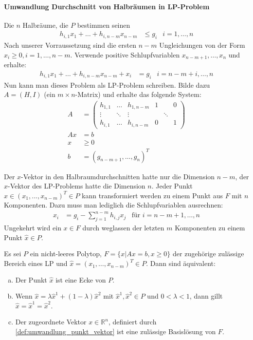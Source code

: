 \paragraph*{Umwandlung  Durchschnitt von Halbräumen in LP-Problem}
Die $n$ Halbräume, die $P$ bestimmen seinen
\begin{align*}
h_{i,1} x_1 + \dotsc + h_{i,n-m} x_{n-m} &\leq g_i & i = 1,\dotsc,n
\end{align*}
Nach unserer Vorraussetzung sind die ersten $n-m$ Ungleichungen von der Form $x_i \geq 0, i = 1,\dotsc,n-m$.
Verwende positive Schlupfvariablen $x_{n-m+1}, \dotsc , x_n$ und erhalte:
\begin{align*}
h_{i,1} x_1 + \dotsc + h_{i,n-m} x_{n-m} + x_i &= g_i & i = n-m+i,\dotsc,n
\end{align*} 
Nun kann man dieses Problem als LP-Problem schreiben. Bilde dazu $A = ( H, I )$ (ein $m\times n$-Matrix) und erhalte das folgende System:
\begin{align*}
A &= \begin{pmatrix}
h_{1,1} & \hdots & h_{1,n-m} & 1 && 0\\
\vdots & \ddots & \vdots && \ddots & \\
h_{i,1} & \hdots & h_{i,n-m} & 0 && 1
\end{pmatrix}\\
Ax &= b\\
x &\geq 0\\
b &= (g_{n-m+1},\dotsc,g_n)^T
\end{align*}
\begin{definition}\label{def:umwandlung_punkt_vektor}
Der $x$-Vektor in den Halbraumdurchschnitten hatte nur die Dimension $n-m$, der $x$-Vektor des LP-Problems hatte die Dimension $n$. 
Jeder Punkt $\hat{x} \in (x_1,...,x_{n-m})^T \in P$ kann transformiert werden zu einem Punkt aus $F$ mit $n$ Komponenten. Dazu muss man lediglich die Schlupfvariablen ausrechnen:
\begin{align*}
x_i &= g_i - \sum_{j=1}^{n-m} h_{i,j}x_j & \text{für $i=n-m+1,\dotsc,n$}
\end{align*}
Ungekehrt wird ein $x\in F$ durch weglassen der letzten $m$ Komponenten zu einem Punkt $\hat{x} \in P$.
\end{definition}
\begin{theorem}
Es sei $P$ ein nicht-leeres Polytop, $F=\{x | Ax = b, x\geq 0\}$ der zugehörige zulässige Bereich eines LP und $\hat{x} = (x_1,\dotsc,x_{n-m})^T \in P$. Dann sind äquivalent:
\begin{enumerate}[a)]
\item Der Punkt $\hat{x}$ ist eine Ecke von $P$.
\item Wenn $\hat{x} = \lambda \hat{x}^1 + (1-\lambda)\hat{x}^2$ mit $\hat{x}^1,\hat{x}^2 \in P$ und $0 < \lambda < 1$, dann gillt $\hat{x} = \hat{x}^1 = \hat{x}^2$.
\item Der zugeordnete Vektor $x \in \mathbb R^n$, definiert durch \ref{def:umwandlung_punkt_vektor} ist eine zulässige Basislösung von $F$. \label{th:basisloesung_eq_ecke}
\end{enumerate}
\end{theorem}
